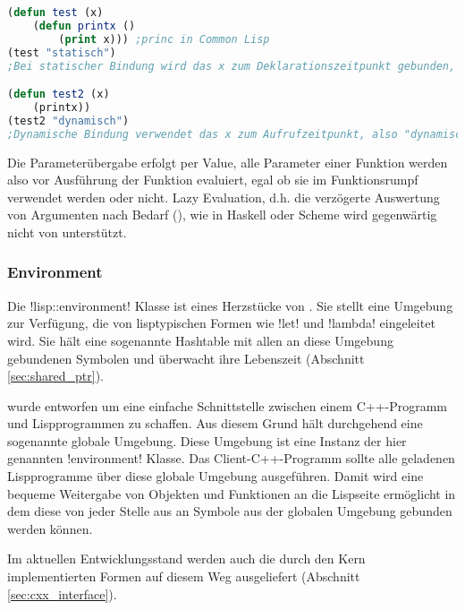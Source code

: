 \begin{lstlisting}[caption={dynamische Bindung}, label=lst:bindung, language=Lisp]
(defun test (x)
    (defun printx ()
        (print x))) ;princ in Common Lisp
(test "statisch")
;Bei statischer Bindung wird das x zum Deklarationszeitpunkt gebunden, also "statisch"

(defun test2 (x)
    (printx))
(test2 "dynamisch")
;Dynamische Bindung verwendet das x zum Aufrufzeitpunkt, also "dynamisch"
\end{lstlisting}

Die Parameterübergabe erfolgt per Value, alle Parameter einer Funktion werden also vor Ausführung der Funktion evaluiert, egal ob sie im Funktionsrumpf verwendet werden oder nicht. Lazy Evaluation, d.h. die verzögerte Auswertung von Argumenten nach Bedarf (\cite[64]{wilhelm_uebersetzerbau_2007}), wie in Haskell oder Scheme wird gegenwärtig nicht von \projectname{} unterstützt.

\subsubsection*{Environment}

Die !lisp::environment! Klasse ist eines Herzstücke von \projectname{}.
Sie stellt eine Umgebung zur Verfügung, die von lisptypischen Formen wie !let! und !lambda!
eingeleitet wird. Sie hält eine sogenannte Hashtable mit allen an diese Umgebung gebundenen
Symbolen und überwacht ihre Lebenszeit (Abschnitt \ref{sec:shared_ptr}).

\projectname{} wurde entworfen um eine einfache Schnittstelle zwischen einem C++-Programm
und Lispprogrammen zu schaffen. Aus diesem Grund hält \projectname{} durchgehend
eine sogenannte globale Umgebung. Diese Umgebung ist eine Instanz der hier genannten 
!environment! Klasse. Das Client-C++-Programm sollte alle geladenen Lispprogramme
über diese globale Umgebung ausgeführen. Damit wird eine bequeme Weitergabe von Objekten
und Funktionen an die Lispseite ermöglicht in dem diese von jeder Stelle aus an Symbole
aus der globalen Umgebung gebunden werden können.

Im aktuellen Entwicklungsstand werden auch die durch den Kern implementierten
Formen auf diesem Weg ausgeliefert (Abschnitt \ref{sec:cxx_interface}).

